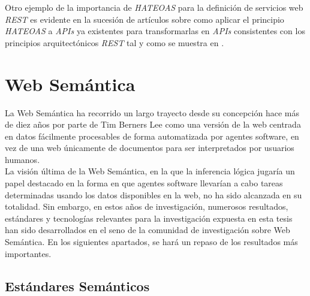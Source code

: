 Otro ejemplo de la importancia de \textit{HATEOAS} para la definici\'on de servicios web \textit{REST} es evidente en la sucesi\'on de art\'iculos sobre como aplicar el principio \textit{HATEOAS} a \textit{APIs} ya existentes para transformarlas en \textit{APIs} consistentes con los principios arquitect\'onicos \textit{REST} tal y como se muestra en \cite{liskin2011teaching}.

\section{Web Sem\'antica}

La Web Sem\'antica ha recorrido un largo trayecto desde su concepci\'on hace m\'as de diez a\~nos por parte de Tim Berners Lee como una versi\'on de la web centrada en datos f\'acilmente procesables de forma automatizada por agentes software, en vez de una web \'unicamente de documentos para ser interpretados por usuarios humanos.\\
La visi\'on \'ultima de la Web Sem\'antica, en la que la inferencia l\'ogica jugar\'ia un papel destacado en la forma en que agentes software llevar\'ian a cabo tareas determinadas usando los datos disponibles en la web, no ha sido alcanzada en su totalidad. Sin embargo, en estos a\~nos de investigaci\'on, numerosos resultados, est\'andares y tecnolog\'ias relevantes para la investigaci\'on expuesta en esta tesis han sido desarrollados en el seno de la comunidad de investigaci\'on sobre Web Sem\'antica. 
En los siguientes apartados, se har\'a un repaso de los resultados m\'as importantes.

\subsection{Est\'andares Sem\'anticos}

